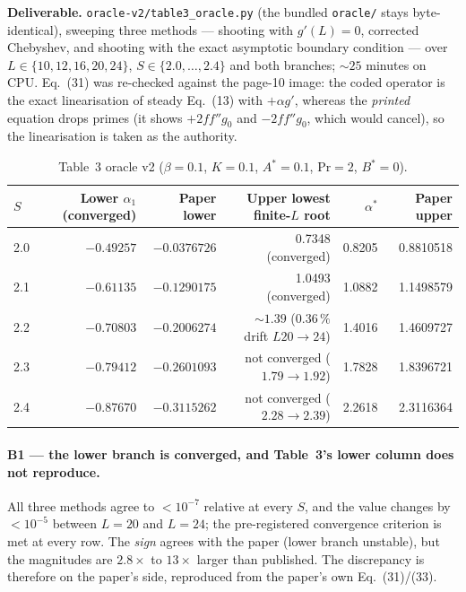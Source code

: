 \documentclass[11pt,a4paper]{article}
\newcommand{\code}[1]{\texttt{\small #1}}
\newcommand{\pct}{\,\%}
\begin{document}
\textbf{Deliverable.} \code{oracle-v2/table3\_oracle.py} (the bundled \code{oracle/} stays
byte-identical), sweeping three methods --- shooting with $g'(L)=0$, corrected Chebyshev,
and shooting with the exact asymptotic boundary condition --- over
$L\in\{10,12,16,20,24\}$, $S\in\{2.0,\ldots,2.4\}$ and both branches; ${\sim}25$ minutes on
CPU. Eq.~(31) was re-checked against the page-10 image: the coded operator is the exact
linearisation of steady Eq.~(13) with $+\alpha g'$, whereas the \emph{printed} equation drops
primes (it shows $+2ff''g_0$ and $-2ff''g_0$, which would cancel), so the linearisation is
taken as the authority.

\begin{table}[ht]
\centering
\caption{Table~3 oracle v2 ($\beta{=}0.1$, $K{=}0.1$, $A^{*}{=}0.1$, $\mathrm{Pr}{=}2$,
$B^{*}{=}0$).}
\label{tab:oraclev2}
\small
\begin{tabular}{@{}lrrrrr@{}}
\toprule
$S$ & \textbf{Lower $\alpha_1$ (converged)} & \textbf{Paper lower} & \textbf{Upper lowest finite-$L$ root} & $\alpha^{*}$ & \textbf{Paper upper} \\
\midrule
2.0 & $-0.49257$ & $-0.0376726$ & 0.7348 (converged) & 0.8205 & 0.8810518 \\
2.1 & $-0.61135$ & $-0.1290175$ & 1.0493 (converged) & 1.0882 & 1.1498579 \\
2.2 & $-0.70803$ & $-0.2006274$ & ${\sim}1.39$ ($0.36\pct$ drift $L20\!\to\!24$) & 1.4016 & 1.4609727 \\
2.3 & $-0.79412$ & $-0.2601093$ & not converged ($1.79\to1.92$) & 1.7828 & 1.8396721 \\
2.4 & $-0.87670$ & $-0.3115262$ & not converged ($2.28\to2.39$) & 2.2618 & 2.3116364 \\
\bottomrule
\end{tabular}
\end{table}

\paragraph{B1 --- the lower branch is converged, and Table~3's lower column does not
reproduce.} All three methods agree to $<10^{-7}$ relative at every $S$, and the value
changes by $<10^{-5}$ between $L{=}20$ and $L{=}24$; the pre-registered convergence
criterion is met at every row. The \emph{sign} agrees with the paper (lower branch
unstable), but the magnitudes are $2.8\times$ to $13\times$ larger than published. The
discrepancy is therefore on the paper's side, reproduced from the paper's own Eq.~(31)/(33).
\end{document}
